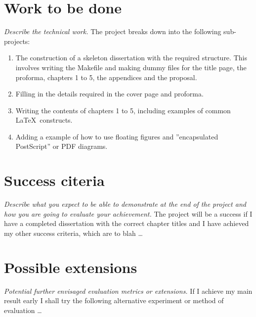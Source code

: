 \documentclass[12pt,a4paper,twoside]{article}
\begin{document}
\section*{Work to be done}
\emph{Describe the technical work.}
The project breaks down into the following sub-projects:
\begin{enumerate}
\item The construction of a skeleton dissertation with the required
structure. This involves writing the Makefile and making dummy
files for the title page, the proforma, chapters 1 to 5, the
appendices and the proposal.
\item Filling in the details required in the cover page and proforma.
\item Writing the contents of chapters 1 to 5, including examples of
common \LaTeX\ constructs.
\item Adding a example of how to use floating figures and ''encapsulated
PostScript'' or PDF diagrams.
\end{enumerate}
\section*{Success citeria}
\emph{Describe what you expect to be able to demonstrate at the
end of the project and how you are going to evaluate your achievement.}
The project will be a success if I have a completed dissertation with
the correct chapter titles and I have achieved my other success
criteria, which are to blah \ldots
\section*{Possible extensions}
{\em Potential further envisaged evaluation metrics or extensions.}
If I achieve my main result early I shall try the following
alternative experiment or method of evaluation \ldots
\end{document}
